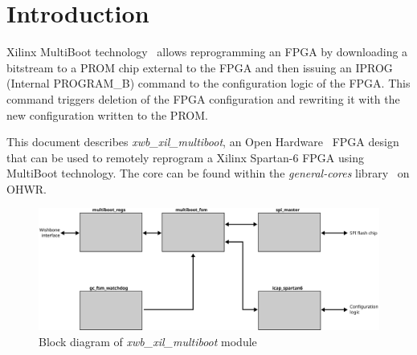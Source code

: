 \documentclass[a4paper,11pt]{article}
\begin{document}
\pagebreak
{}
\setcounter{page}{1}

\section{Introduction}
\label{sec:intro}

Xilinx MultiBoot technology~\cite{ug380} allows reprogramming an FPGA by downloading a
bitstream to a PROM chip external to the FPGA and then issuing an IPROG (Internal
PROGRAM\_B) command to the configuration logic of the FPGA. This command triggers
deletion of the FPGA configuration and rewriting it with the new configuration
written to the PROM.

This document describes \textit{xwb\_xil\_multiboot}, an Open Hardware~\cite{ohwr}
FPGA design that can be used to remotely reprogram a Xilinx Spartan-6 FPGA using
MultiBoot technology. The core can be found within the \textit{general-cores}
library~\cite{gencores-ohwr} on OHWR.

\begin{figure}[h]
  \centerline{\includegraphics[width=\textwidth]{fig/multiboot-bd}}
  \label{fig:multiboot-bd}
  \caption{Block diagram of \textit{xwb\_xil\_multiboot} module}
\end{figure}
\end{document}
